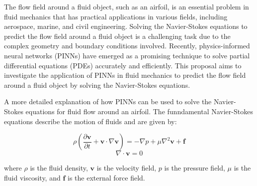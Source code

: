
The flow field around a fluid object, such as an airfoil, is an essential problem in fluid mechanics that has practical applications in various fields, including aerospace, marine, and civil engineering. Solving the Navier-Stokes equations to predict the flow field around a fluid object is a challenging task due to the complex geometry and boundary conditions involved. Recently, physics-informed neural networks (PINNs) have emerged as a promising technique to solve partial differential equations (PDEs) accurately and efficiently. This proposal aims to investigate the application of PINNs in fluid mechanics to predict the flow field around a fluid object by solving the Navier-Stokes equations.

A more detailed explanation of how PINNs can be used to solve the Navier-Stokes equations for fluid flow around an airfoil. The funndamental Navier-Stokes equations describe the motion of fluids and are given by:

$$\rho\left(\frac{\partial\textbf{v}}{\partial t}+\textbf{v}\cdot\nabla\textbf{v}\right)=-\nabla p+\mu\nabla^2\textbf{v}+\textbf{f}$$
$$\nabla\cdot\textbf{v}=0$$

where $\rho$ is the fluid density, $\textbf{v}$ is the velocity field, $p$ is the pressure field, $\mu$ is the fluid viscosity, and $\textbf{f}$ is the external force field.

